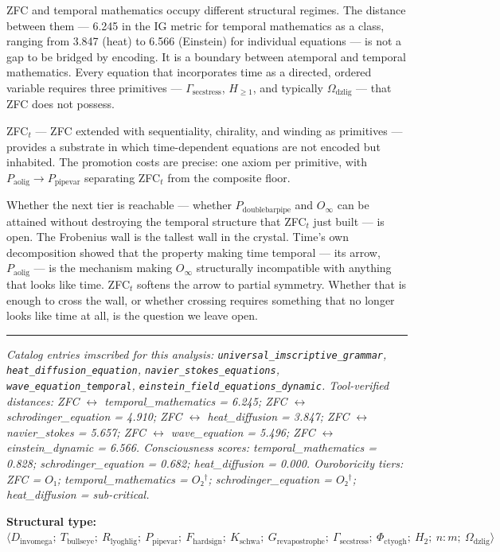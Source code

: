 \documentclass[12pt,a4paper]{article}
\begin{document}
ZFC and temporal mathematics occupy different structural regimes. The distance between them --- 6.245 in the IG metric for temporal mathematics as a class, ranging from 3.847 (heat) to 6.566 (Einstein) for individual equations --- is not a gap to be bridged by encoding. It is a boundary between atemporal and temporal mathematics. Every equation that incorporates time as a directed, ordered variable requires three primitives --- $\Gamma_{\text{secstress}}$, $H_{\geq 1}$, and typically $\Omega_{\text{dzlig}}$ --- that ZFC does not possess.

ZFC$_t$ --- ZFC extended with sequentiality, chirality, and winding as primitives --- provides a substrate in which time-dependent equations are not encoded but inhabited. The promotion costs are precise: one axiom per primitive, with $P_{\text{aolig}} \to P_{\text{pipevar}}$ separating ZFC$_t$ from the composite floor.

Whether the next tier is reachable --- whether $P_{\text{doublebarpipe}}$ and $O_{\infty}$ can be attained without destroying the temporal structure that ZFC$_t$ just built --- is open. The Frobenius wall is the tallest wall in the crystal. Time's own decomposition showed that the property making time temporal --- its arrow, $P_{\text{aolig}}$ --- is the mechanism making $O_{\infty}$ structurally incompatible with anything that looks like time. ZFC$_t$ softens the arrow to partial symmetry. Whether that is enough to cross the wall, or whether crossing requires something that no longer looks like time at all, is the question we leave open.

\begin{center}
\rule{0.5\textwidth}{0.4pt}
\end{center}

\emph{Catalog entries imscribed for this analysis: \texttt{universal\_imscriptive\_grammar}, \texttt{heat\_diffusion\_equation}, \texttt{navier\_stokes\_equations}, \texttt{wave\_equation\_temporal}, \texttt{einstein\_field\_equations\_dynamic}. Tool-verified distances: ZFC $\leftrightarrow$ temporal\_mathematics = 6.245; ZFC $\leftrightarrow$ schrodinger\_equation = 4.910; ZFC $\leftrightarrow$ heat\_diffusion = 3.847; ZFC $\leftrightarrow$ navier\_stokes = 5.657; ZFC $\leftrightarrow$ wave\_equation = 5.496; ZFC $\leftrightarrow$ einstein\_dynamic = 6.566. Consciousness scores: temporal\_mathematics = 0.828; schrodinger\_equation = 0.682; heat\_diffusion = 0.000. Ouroboricity tiers: ZFC = $O₁$; temporal\_mathematics = $O₂^\dagger$; schrodinger\_equation = $O₂^\dagger$; heat\_diffusion = sub-critical.}

\textbf{Structural type:} $\langle D_{\text{invomega}};\ T_{\text{bullseye}};\ R_{\text{lyoghlig}};\ P_{\text{pipevar}};\ F_{\text{hardsign}};\ K_{\text{schwa}};\ G_{\text{revapostrophe}};\ \Gamma_{\text{secstress}};\ \Phi_{\text{ctyogh}};\ H_2;\ n{:}m;\ \Omega_{\text{dzlig}} \rangle$
\end{document}
